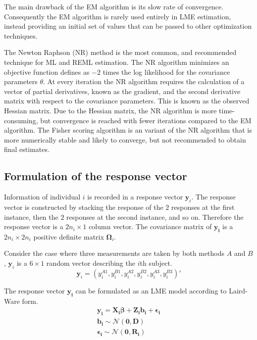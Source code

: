 \documentclass[12pt, a4paper]{report}
\theoremstyle{plain}
\theoremstyle{definition}
\theoremstyle{remark}
\begin{document}
	The main drawback of the EM algorithm is its slow rate of
	convergence. Consequently the EM algorithm is rarely used entirely in LME estimation,
	instead providing an initial set of values that can be passed to
	other optimization techniques.
	
	The Newton Raphson (NR) method is the most common, and recommended technique for ML and
	REML estimation. The NR algorithm minimizes an objective function defines as $-2$ times the log likelihood for the covariance parameters $\theta$. At every iteration the NR algorithm requires the
	calculation of a vector of partial derivatives, known as the gradient, and the second derivative matrix with respect to the covariance parameters. This is known as the observed Hessian matrix. Due to the Hessian matrix, the NR algorithm is more time-consuming, but convergence is reached with fewer iterations compared to the EM algorithm. The Fisher scoring algorithm is an variant of the NR algorithm that is more numerically stable and likely to converge, but not recommended to obtain final estimates.
	
	
	\subsection{Formulation of the response vector}
	Information of individual $i$ is recorded in a response vector $\boldsymbol{y}_{i}$. The response vector is constructed by stacking the response of the $2$ responses at the first instance, then the $2$ responses at the second instance, and so on. Therefore the response vector is a $2n_{i} \times 1$ column vector.
	The covariance matrix of $\boldsymbol{y_{i}}$ is a $2n_{i} \times 2n_{i}$ positive definite matrix $\boldsymbol{\Omega}_{i}$.
	
	Consider the case where three measurements are taken by both methods $A$ and $B$, $\boldsymbol{y}_{i}$ is a $6 \times 1$ random vector describing the $i$th subject.
	\[
	\boldsymbol{y}_{i} = (y_{i}^{A1},y_{i}^{B1},y_{i}^{A2},y_{i}^{B2},y_{i}^{A3},y_{i}^{B3}) \prime
	\]
	
	The response vector $\boldsymbol{y_{i}}$ can be formulated as an LME model according to Laird-Ware form.
	\begin{eqnarray*}
		\boldsymbol{y_{i}} = \boldsymbol{X_{i}\beta}  + \boldsymbol{Z_{i}b_{i}} + \boldsymbol{\epsilon_{i}}\\
		\boldsymbol{b_{i}} \sim \mathcal{N}(\boldsymbol{0,D})\\
		\boldsymbol{\epsilon_{i}} \sim \mathcal{N}(\boldsymbol{0,R_{i}})
	\end{eqnarray*}
	
\end{document}
